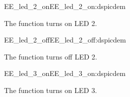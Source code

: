 \begin{function_nopb2}{EE\_led\_2\_on}{EE_led_2_on:dspicdem}
  
  \begin{fundescription}
    The function turns on LED 2.
  \end{fundescription}
  
  
  
\end{function_nopb2}

\begin{function_nopb2}{EE\_led\_2\_off}{EE_led_2_off:dspicdem}
  
  \begin{fundescription}
    The function turns off LED 2.
  \end{fundescription}
  
  
  
\end{function_nopb2}

\begin{function_nopb2}{EE\_led\_3\_on}{EE_led_3_on:dspicdem}
  
  \begin{fundescription}
    The function turns on LED 3.
  \end{fundescription}
  
  
  
\end{function_nopb2}


